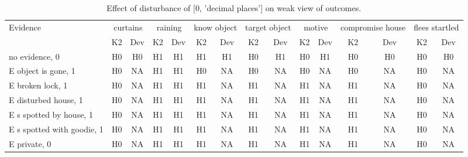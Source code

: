 \begin{table}\begin{tabular}{l|cc|cc|cc|cc|cc|cc|cc}\toprule\multirow{2}{*}{Evidence} & \multicolumn{2}{c}{curtains}& \multicolumn{2}{c}{raining}& \multicolumn{2}{c}{know object}& \multicolumn{2}{c}{target object}& \multicolumn{2}{c}{motive}& \multicolumn{2}{c}{compromise house}& \multicolumn{2}{c}{flees startled}\\& {K2} & {Dev}& {K2} & {Dev}& {K2} & {Dev}& {K2} & {Dev}& {K2} & {Dev}& {K2} & {Dev}& {K2} & {Dev}\\\midrule
no evidence, 0 & H0&H0&H1&H1&H1&H1&\cellcolor{Bittersweet}H0&\cellcolor{Bittersweet}H1&\cellcolor{Bittersweet}H0&\cellcolor{Bittersweet}H1&H0&H0&H0&H0\\E object is gone, 1 & \cellcolor{Bittersweet}H0&\cellcolor{Bittersweet}NA&H1&H1&\cellcolor{Bittersweet}H0&\cellcolor{Bittersweet}NA&\cellcolor{Bittersweet}H0&\cellcolor{Bittersweet}NA&\cellcolor{Bittersweet}H0&\cellcolor{Bittersweet}NA&\cellcolor{Bittersweet}H0&\cellcolor{Bittersweet}NA&\cellcolor{Bittersweet}H0&\cellcolor{Bittersweet}NA\\E broken lock, 1 & \cellcolor{Bittersweet}H0&\cellcolor{Bittersweet}NA&H1&H1&\cellcolor{Bittersweet}H1&\cellcolor{Bittersweet}NA&\cellcolor{Bittersweet}H1&\cellcolor{Bittersweet}NA&\cellcolor{Bittersweet}H1&\cellcolor{Bittersweet}NA&\cellcolor{Bittersweet}H1&\cellcolor{Bittersweet}NA&\cellcolor{Bittersweet}H0&\cellcolor{Bittersweet}NA\\E disturbed house, 1 & \cellcolor{Bittersweet}H0&\cellcolor{Bittersweet}NA&H1&H1&\cellcolor{Bittersweet}H1&\cellcolor{Bittersweet}NA&\cellcolor{Bittersweet}H1&\cellcolor{Bittersweet}NA&\cellcolor{Bittersweet}H1&\cellcolor{Bittersweet}NA&\cellcolor{Bittersweet}H1&\cellcolor{Bittersweet}NA&\cellcolor{Bittersweet}H0&\cellcolor{Bittersweet}NA\\E s spotted by house, 1 & \cellcolor{Bittersweet}H0&\cellcolor{Bittersweet}NA&H1&H1&\cellcolor{Bittersweet}H1&\cellcolor{Bittersweet}NA&\cellcolor{Bittersweet}H1&\cellcolor{Bittersweet}NA&\cellcolor{Bittersweet}H1&\cellcolor{Bittersweet}NA&\cellcolor{Bittersweet}H1&\cellcolor{Bittersweet}NA&\cellcolor{Bittersweet}H0&\cellcolor{Bittersweet}NA\\E s spotted with goodie, 1 & \cellcolor{Bittersweet}H0&\cellcolor{Bittersweet}NA&H1&H1&\cellcolor{Bittersweet}H1&\cellcolor{Bittersweet}NA&\cellcolor{Bittersweet}H1&\cellcolor{Bittersweet}NA&\cellcolor{Bittersweet}H1&\cellcolor{Bittersweet}NA&\cellcolor{Bittersweet}H1&\cellcolor{Bittersweet}NA&\cellcolor{Bittersweet}H0&\cellcolor{Bittersweet}NA\\E private, 0 & \cellcolor{Bittersweet}H0&\cellcolor{Bittersweet}NA&H1&H1&\cellcolor{Bittersweet}H1&\cellcolor{Bittersweet}NA&\cellcolor{Bittersweet}H1&\cellcolor{Bittersweet}NA&\cellcolor{Bittersweet}H1&\cellcolor{Bittersweet}NA&\cellcolor{Bittersweet}H1&\cellcolor{Bittersweet}NA&\cellcolor{Bittersweet}H0&\cellcolor{Bittersweet}NA\\\bottomrule\end{tabular}\caption{Effect of disturbance of [0, 'decimal places'] on weak view of outcomes.}\end{table}